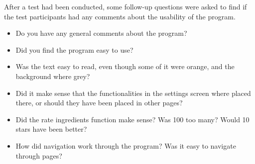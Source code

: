 After a test had been conducted, some follow-up questions were asked to find if the test participants had any comments about the usability of the program.

\begin{itemize}
    \item Do you have any general comments about the program?
    \item Did you find the program easy to use?
    \item Was the text easy to read, even though some of it were orange, and the background where grey?
    \item Did it make sense that the functionalities in the settings screen where placed there, or should they have been placed in other pages?
    \item Did the rate ingredients function make sense? Was 100 too many? Would 10 stars have been better?
    \item How did navigation work through the program? Was it easy to navigate through pages?
\end{itemize}